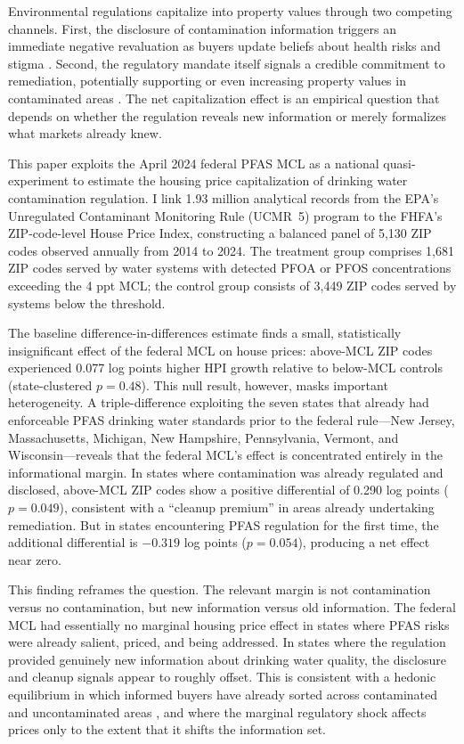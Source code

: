 \documentclass[12pt]{article}
\begin{document}
Environmental regulations capitalize into property values through two competing channels. First, the disclosure of contamination information triggers an immediate negative revaluation as buyers update beliefs about health risks and stigma \citep{Pope2008, Linden2008}. Second, the regulatory mandate itself signals a credible commitment to remediation, potentially supporting or even increasing property values in contaminated areas \citep{Greenstone2006, Gamper2020}. The net capitalization effect is an empirical question that depends on whether the regulation reveals new information or merely formalizes what markets already knew.

This paper exploits the April 2024 federal PFAS MCL as a national quasi-experiment to estimate the housing price capitalization of drinking water contamination regulation. I link 1.93 million analytical records from the EPA's Unregulated Contaminant Monitoring Rule (UCMR~5) program to the FHFA's ZIP-code-level House Price Index, constructing a balanced panel of 5,130 ZIP codes observed annually from 2014 to 2024. The treatment group comprises 1,681 ZIP codes served by water systems with detected PFOA or PFOS concentrations exceeding the 4 ppt MCL; the control group consists of 3,449 ZIP codes served by systems below the threshold.

The baseline difference-in-differences estimate finds a small, statistically insignificant effect of the federal MCL on house prices: above-MCL ZIP codes experienced 0.077 log points higher HPI growth relative to below-MCL controls (state-clustered $p = 0.48$). This null result, however, masks important heterogeneity. A triple-difference exploiting the seven states that already had enforceable PFAS drinking water standards prior to the federal rule---New Jersey, Massachusetts, Michigan, New Hampshire, Pennsylvania, Vermont, and Wisconsin---reveals that the federal MCL's effect is concentrated entirely in the informational margin. In states where contamination was already regulated and disclosed, above-MCL ZIP codes show a positive differential of 0.290 log points ($p = 0.049$), consistent with a ``cleanup premium'' in areas already undertaking remediation. But in states encountering PFAS regulation for the first time, the additional differential is $-0.319$ log points ($p = 0.054$), producing a net effect near zero.

This finding reframes the question. The relevant margin is not contamination versus no contamination, but new information versus old information. The federal MCL had essentially no marginal housing price effect in states where PFAS risks were already salient, priced, and being addressed. In states where the regulation provided genuinely new information about drinking water quality, the disclosure and cleanup signals appear to roughly offset. This is consistent with a hedonic equilibrium in which informed buyers have already sorted across contaminated and uncontaminated areas \citep{Rosen1974, Banzhaf2012}, and where the marginal regulatory shock affects prices only to the extent that it shifts the information set.
\end{document}
